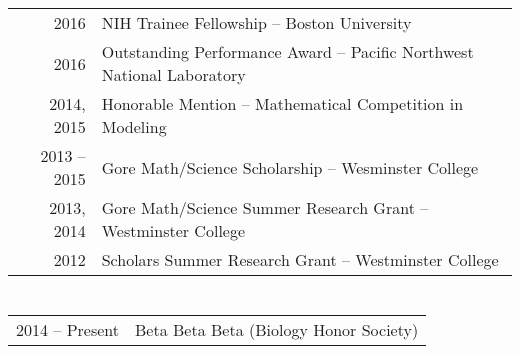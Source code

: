 \documentclass[a4paper,10pt]{article}
\begin{document}
\section{\color{linkcolour}{Awards and Accolades}}
\begin{tabular}{rl}
2016 & NIH Trainee Fellowship -- Boston University \\
2016 & Outstanding Performance Award -- Pacific Northwest National Laboratory
\\ 2014, 2015 & Honorable Mention -- Mathematical Competition in Modeling
\\ 2013 -- 2015&  Gore Math/Science Scholarship -- Wesminster College
\\ 2013, 2014& Gore Math/Science Summer Research Grant -- Westminster College
\\ 2012 & Scholars Summer Research Grant -- Westminster College
\end{tabular}

\section{\color{linkcolour}{Professional Affiliations}}
\begin{tabular}{rl}
2014 -- Present & Beta Beta Beta (Biology Honor Society) \\
\end{tabular}
\end{document}
